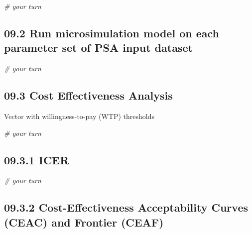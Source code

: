 \documentclass[
]{article}
\newenvironment{Shaded}{\begin{snugshade}}{\end{snugshade}}
\newcommand{\CommentTok}[1]{\textcolor[rgb]{0.56,0.35,0.01}{\textit{#1}}}
\begin{document}
\begin{Shaded}
\begin{Highlighting}[]
\CommentTok{# your turn}
\end{Highlighting}
\end{Shaded}

\hypertarget{run-microsimulation-model-on-each-parameter-set-of-psa-input-dataset}{%
\subsection{09.2 Run microsimulation model on each parameter set of PSA
input
dataset}\label{run-microsimulation-model-on-each-parameter-set-of-psa-input-dataset}}

\begin{Shaded}
\begin{Highlighting}[]
\CommentTok{# your turn}
\end{Highlighting}
\end{Shaded}

\hypertarget{cost-effectiveness-analysis-1}{%
\subsection{09.3 Cost Effectiveness
Analysis}\label{cost-effectiveness-analysis-1}}

Vector with willingness-to-pay (WTP) thresholds

\begin{Shaded}
\begin{Highlighting}[]
\CommentTok{# your turn}
\end{Highlighting}
\end{Shaded}

\hypertarget{icer}{%
\subsection{09.3.1 ICER}\label{icer}}

\begin{Shaded}
\begin{Highlighting}[]
\CommentTok{# your turn}
\end{Highlighting}
\end{Shaded}

\hypertarget{cost-effectiveness-acceptability-curves-ceac-and-frontier-ceaf}{%
\subsection{09.3.2 Cost-Effectiveness Acceptability Curves (CEAC) and
Frontier
(CEAF)}\label{cost-effectiveness-acceptability-curves-ceac-and-frontier-ceaf}}
\end{document}
